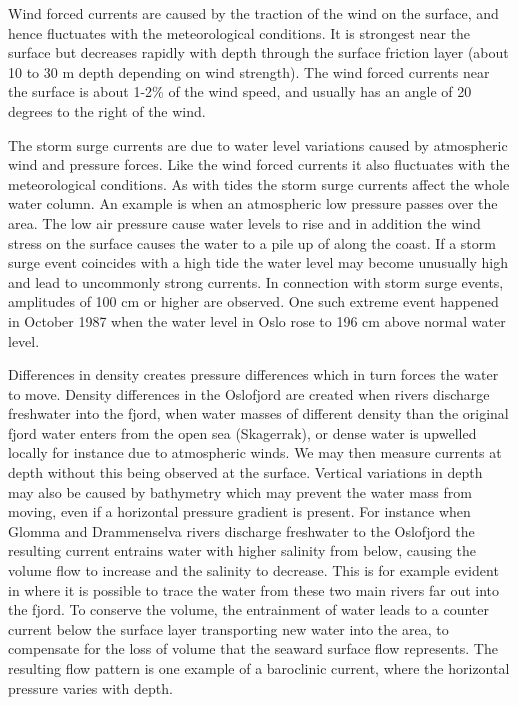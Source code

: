 Wind forced currents are caused by the traction of the wind on the surface, and hence fluctuates with the meteorological conditions. It is strongest near the surface but decreases rapidly with depth through the surface friction layer (about 10 to 30 m depth depending on wind strength). The wind forced currents near the surface is about 1-2\% of the wind speed, and usually has an angle of 20 degrees to the right of the wind. 

The storm surge currents are due to water level variations caused by atmospheric wind and pressure forces. Like the wind forced currents it also fluctuates with the meteorological conditions. As with tides the storm surge currents affect the whole water column. An example is when an atmospheric low pressure passes over the area. The low air pressure cause water levels to rise and in addition the wind stress on the surface causes the water to a pile up of along the coast. If a storm surge event coincides with a high tide the water level may become unusually high and lead to uncommonly strong currents. In connection with storm surge events, amplitudes of 100 cm or higher are observed. One such extreme event happened in October 1987 when the water level in Oslo rose to 196 cm above normal water level. 

Differences in density creates pressure differences which in turn forces the water to move. Density differences in the Oslofjord are created when rivers discharge freshwater into the fjord, when water masses of different density than the original fjord water enters from the open sea (Skagerrak), or dense water is upwelled locally for instance due to atmospheric winds. We may then measure currents at depth without this being observed at the surface. Vertical variations in depth may also be caused by bathymetry which may prevent the water mass from moving, even if a horizontal pressure gradient is present. For instance when Glomma and Drammenselva rivers discharge freshwater to the Oslofjord the resulting current entrains water with higher salinity from below, causing the volume flow to increase and the salinity to decrease. This is for example evident in \cite[][Figure 20]{roed:etal:2016} where it is possible to trace the water from these two main rivers far out into the fjord. To conserve the volume, the entrainment of water leads to a counter current below the surface layer transporting new water into the area, to compensate for the loss of volume that the seaward surface flow represents. The resulting flow pattern is one example of a baroclinic current, where the horizontal pressure varies with depth. 

